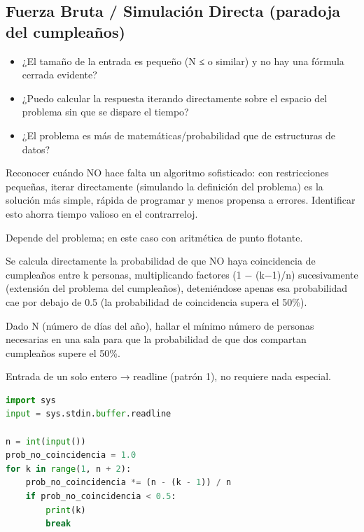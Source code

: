 \subsection{Fuerza Bruta / Simulación Directa (paradoja del cumpleaños)}


\begin{itemize}
\item ¿El tamaño de la entrada es pequeño (N ≤  o similar) y no hay una fórmula cerrada evidente?
\item ¿Puedo calcular la respuesta iterando directamente sobre el espacio del problema sin que se dispare el tiempo?
\item ¿El problema es más de matemáticas/probabilidad que de estructuras de datos?
\end{itemize}

 Reconocer cuándo NO hace falta un algoritmo sofisticado: con restricciones pequeñas, iterar directamente (simulando la definición del problema) es la solución más simple, rápida de programar y menos propensa a errores. Identificar esto ahorra tiempo valioso en el contrarreloj.

 Depende del problema; en este caso  con aritmética de punto flotante.

 Se calcula directamente la probabilidad de que NO haya coincidencia de cumpleaños entre k personas, multiplicando factores (1 − (k−1)/n) sucesivamente (extensión del problema del cumpleaños), deteniéndose apenas esa probabilidad cae por debajo de 0.5 (la probabilidad de coincidencia supera el 50\%).


Dado N (número de días del año), hallar el mínimo número de personas necesarias en una sala para que la probabilidad de que dos compartan cumpleaños supere el 50\%.

 Entrada de un solo entero → readline (patrón 1), no requiere nada especial.


\begin{lstlisting}[language=Python]
import sys
input = sys.stdin.buffer.readline
 
n = int(input())
prob_no_coincidencia = 1.0
for k in range(1, n + 2):
    prob_no_coincidencia *= (n - (k - 1)) / n
    if prob_no_coincidencia < 0.5:
        print(k)
        break
\end{lstlisting}
